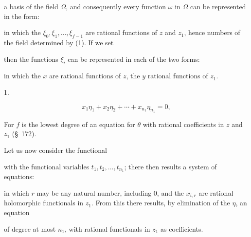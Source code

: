a basis of the field $\Omega$, and consequently every function $\omega$
in $\Omega$ can be represented in the form:

in which the $\xi_0, \xi_1, \ldots, \xi_{f-1}$ are rational functions of $z$ and
$z_1$, hence numbers of the field determined by (1). If we set

then the functions $\xi_i$ can be represented in each of the two
forms:

in which the $x$ are rational functions of $z$, the $y$ rational functions
of $z_1$.

1. 


\[
x_1\eta_1 + x_2\eta_2 + \cdots + x_{n_1}\eta_{n_1} = 0,
\]

For $f$ is the lowest degree of an equation for $\theta$ with
rational coefficients in $z$ and $z_1$ (\S\ 172).

Let us now consider the functional

with the functional variables $t_1, t_2, \ldots, t_{n_1}$; there then results
a system of equations:

in which $r$ may be any natural number, including 0, and the $x_{i,r}$
are rational holomorphic functionals in $z_1$. From this there results,
by elimination of the $\eta$, an equation

of degree at most $n_1$, with rational functionals in $z_1$ as
coefficients.

